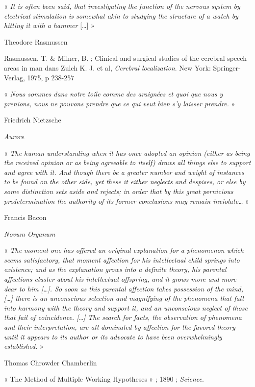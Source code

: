 \documentclass[a4paper,12pt,twoside]{report}
\begin{document}
\begin{onehalfspacing}
\cleardoublepage

\noindent « \textit{It is often been said, that investigating the function of the nervous system by electrical stimulation is somewhat akin to studying the structure of a watch by hitting it with a hammer} [\ldots] »

Theodore Rasmussen

Rasmussen, T. \& Milner, B. ; Clinical and surgical studies of the cerebral speech areas in man dans Zulch K. J. et al, \textit{Cerebral localization}. New York: Springer-Verlag, 1975, p 238-257

\vspace{2cm}

\noindent « \textit{Nous sommes dans notre toile comme des araignées et quoi que nous y prenions, nous ne pouvons prendre que ce qui veut bien s’y laisser prendre.} »

Friedrich Nietzsche

\textit{Aurore}

\vspace{2cm}

\noindent « \textit{The human understanding when it has once adopted an opinion (either as being the received opinion or as being agreeable to itself) draws all things else to support and agree with it. And though there be a greater number and weight of instances to be found on the other side, yet these it either neglects and despises, or else by some distinction sets aside and rejects; in order that by this great pernicious predetermination the authority of its former conclusions may remain inviolate\ldots} »

Francis Bacon

\textit{Novum Organum}

\vspace{2cm}

\noindent « \textit{The moment one has offered an original explanation for a phenomenon which seems satisfactory, that moment affection for his intellectual child springs into existence; and as the explanation grows into a definite theory, his parental affections cluster about his intellectual offspring, and it grows more and more dear to him [\ldots]. So soon as this parental affection takes possession of the mind, [\ldots] there is an unconscious selection and magnifying of the phenomena that fall into harmony with the theory and support it, and an unconscious neglect of those that fail of coincidence. [\ldots] The search for facts, the observation of phenomena and their interpretation, are all dominated by affection for the favored theory until it appears to its author or its advocate to have been overwhelmingly established.} »

Thomas Chrowder Chamberlin

« The Method of Multiple Working Hypotheses » ; 1890 ; \textit{Science}.

\end{onehalfspacing}
\end{document}

